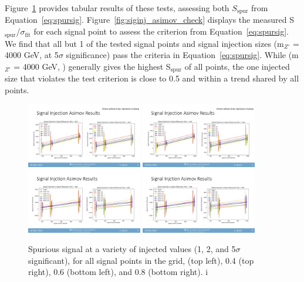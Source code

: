 Figure~\ref{fig:siginj_asimov} provides tabular results of these tests, assessing both $S_{\text{spur}}$ from Equation~\ref{eq:spursig}.
Figure~\ref{fig:siginj_asimov_check} displays the measured S$_{\text{spur}}$/$\sigma_\text{fit}$ for each signal point to assess the criterion from Equation~\ref{eq:spursig}.
We find that all but 1 of the tested signal points and signal injection sizes (m$_{Z'}$ = 4000 GeV,  at 5$\sigma$ significance) pass the criteria in Equation~\ref{eq:spursig}. %
While (m$_{Z'}$ = 4000 GeV, ) generally gives the highest S$_{\text{spur}}$ of all points, the one injected size that violates the test criterion is close to 0.5 and within a trend shared by all points. 
\begin{figure}[!htbp]
\centering
   \includegraphics[width=0.45\textwidth]{figures/stats/siginj_asimov_02}
   \includegraphics[width=0.45\textwidth]{figures/stats/siginj_asimov_04}
   \includegraphics[width=0.45\textwidth]{figures/stats/siginj_asimov_06}
   \includegraphics[width=0.45\textwidth]{figures/stats/siginj_asimov_08}
   \caption{Spurious signal at a variety of injected values (1, 2, and 5$\sigma$ significant), for all signal points in the grid,  (top left), 0.4 (top right), 0.6 (bottom left), and 0.8 (bottom right).
i%
    \label{fig:siginj_asimov}}
\end{figure}

